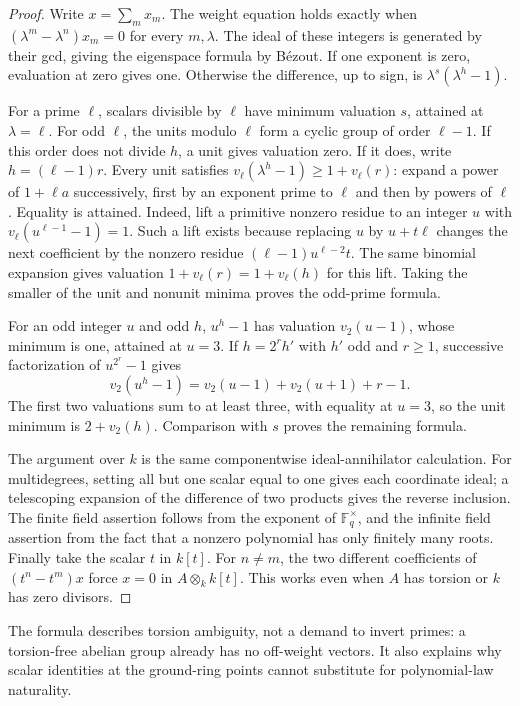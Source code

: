 \documentclass[11pt,a4paper]{article}
\theoremstyle{definition}
\newcommand{\F}{\mathbb F}
\begin{document}
\begin{proof}
Write $x=\sum_m x_m$. The weight equation holds exactly when
$(\lambda^m-\lambda^n)x_m=0$ for every $m,\lambda$. The ideal of
these integers is generated by their gcd, giving the eigenspace
formula by B\'ezout. If one exponent is zero, evaluation at zero gives
one. Otherwise the difference, up to sign, is
$\lambda^s(\lambda^h-1)$.

For a prime $\ell$, scalars divisible by $\ell$ have minimum valuation
$s$, attained at $\lambda=\ell$. For odd $\ell$, the units modulo
$\ell$ form a cyclic group of order $\ell-1$. If this order does
not divide $h$, a unit gives valuation zero. If it does, write
$h=(\ell-1)r$. Every unit satisfies
$v_\ell(\lambda^h-1)\ge1+v_\ell(r)$: expand a power of
$1+\ell a$ successively, first by an exponent prime to $\ell$ and
then by powers of $\ell$. Equality is attained. Indeed, lift a
primitive nonzero residue to an integer $u$ with
$v_\ell(u^{\ell-1}-1)=1$. Such a lift exists because replacing $u$
by $u+t\ell$ changes the next coefficient by the nonzero residue
$(\ell-1)u^{\ell-2}t$. The same binomial expansion gives valuation
$1+v_\ell(r)=1+v_\ell(h)$ for this lift. Taking the smaller of
the unit and nonunit minima proves the odd-prime formula.

For an odd integer $u$ and odd $h$, $u^h-1$ has valuation
$v_2(u-1)$, whose minimum is one, attained at $u=3$. If
$h=2^r h'$ with $h'$ odd and $r\ge1$, successive factorization of
$u^{2^r}-1$ gives
\[
 v_2(u^h-1)=v_2(u-1)+v_2(u+1)+r-1.
\]
The first two valuations sum to at least three, with equality at
$u=3$, so the unit minimum is $2+v_2(h)$. Comparison with $s$
proves the remaining formula.

The argument over $k$ is the same componentwise ideal-annihilator
calculation. For multidegrees, setting all but one scalar equal to
one gives each coordinate ideal; a telescoping expansion of the
difference of two products gives the reverse inclusion. The finite
field assertion follows from the exponent of $\F_q^\times$, and
the infinite field assertion from the fact that a nonzero polynomial
has only finitely many roots. Finally take the scalar $t$ in $k[t]$.
For $n\ne m$, the two different coefficients of
$(t^n-t^m)x$ force $x=0$ in $A\otimes_k k[t]$. This works even
when $A$ has torsion or $k$ has zero divisors.
\end{proof}
The formula describes torsion ambiguity, not a demand to invert
primes: a torsion-free abelian group already has no off-weight
vectors. It also explains why scalar identities at the ground-ring
points cannot substitute for polynomial-law naturality.
\end{document}
